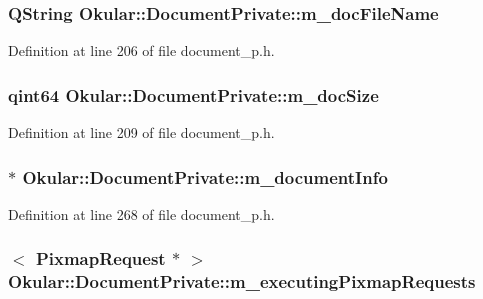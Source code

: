 \hypertarget{classOkular_1_1DocumentPrivate_af56dcee87c3465c69da7cea920b95fbb}{
\subsubsection[{m\+\_\+doc\+File\+Name}]{\setlength{\rightskip}{0pt plus 5cm}Q\+String Okular\+::\+Document\+Private\+::m\+\_\+doc\+File\+Name}}\label{classOkular_1_1DocumentPrivate_af56dcee87c3465c69da7cea920b95fbb}


Definition at line 206 of file document\+\_\+p.\+h.

\hypertarget{classOkular_1_1DocumentPrivate_afe0b6665f1386848faf6e6763e7f6cf4}{
\subsubsection[{m\+\_\+doc\+Size}]{\setlength{\rightskip}{0pt plus 5cm}qint64 Okular\+::\+Document\+Private\+::m\+\_\+doc\+Size}}\label{classOkular_1_1DocumentPrivate_afe0b6665f1386848faf6e6763e7f6cf4}


Definition at line 209 of file document\+\_\+p.\+h.

\hypertarget{classOkular_1_1DocumentPrivate_a4452394f3abc747fa0b4910c33806371}{
\subsubsection[{m\+\_\+document\+Info}]{$\ast$ Okular\+::\+Document\+Private\+::m\+\_\+document\+Info}}\label{classOkular_1_1DocumentPrivate_a4452394f3abc747fa0b4910c33806371}


Definition at line 268 of file document\+\_\+p.\+h.

\hypertarget{classOkular_1_1DocumentPrivate_adc84c2f8f76e7880b41e155edabf69e7}{
\subsubsection[{m\+\_\+executing\+Pixmap\+Requests}]{$<$ {\bf Pixmap\+Request} $\ast$ $>$ Okular\+::\+Document\+Private\+::m\+\_\+executing\+Pixmap\+Requests}}\label{classOkular_1_1DocumentPrivate_adc84c2f8f76e7880b41e155edabf69e7}


